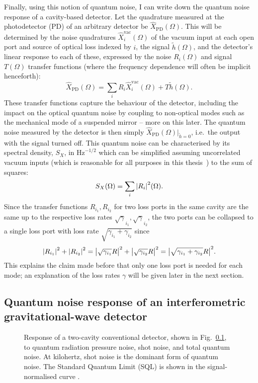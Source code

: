 Finally, using this notion of quantum noise, I can write down the quantum noise response of a cavity-based detector. %
Let the quadrature measured at the photodetector (PD) of an arbitrary detector be $\hat{X}_\text{PD}(\Omega)$. This will be determined by the noise quadratures $\hat{X}_i^\text{vac}(\Omega)$ of the vacuum input at each open port and source of optical loss indexed by $i$, the signal $\tilde{h}(\Omega)$, and the detector's linear response to each of these, expressed by the noise $R_i(\Omega)$ and signal $T(\Omega)$ transfer functions (where the frequency dependence will often be implicit henceforth): $$\hat X_\text{PD}(\Omega)=\sum_i R_i \hat X_i^\text{vac}(\Omega) + T \tilde h(\Omega).$$
These transfer functions capture the behaviour of the detector, including the impact on the optical quantum noise by coupling to non-optical modes such as the mechanical mode of a suspended mirror -- more on this later. 
The quantum noise measured by the detector is then simply $\hat X_\text{PD}(\Omega)|_{\tilde h=0}$, i.e.\ the output with the signal turned off. This quantum noise can be characterised by its spectral density, $S_X$, in $\text{Hz}^{-1/2}$ which can be simplified assuming uncorrelated vacuum inputs (which is reasonable for all purposes in this thesis~\cite{}) to the sum of squares: $$S_X(\Omega)=\sum_i \abs{R_i}^2(\Omega).$$ 
Since the transfer functions $R_{i_1}, R_{i_2}$ for two loss ports in the same cavity are the same up to the respective loss rates $\sqrt\gamma_{i_1}, \sqrt\gamma_{i_2}$, the two ports can be collapsed to a single loss port with loss rate $\sqrt{\gamma_{i_1}+\gamma_{i_2}}$ since $$\abs{R_{i_1}}^2+\abs{R_{i_2}}^2=\abs{\sqrt{\gamma_{i_1}}R}^2+\abs{\sqrt{\gamma_{i_2}}R}^2=\abs{\sqrt{\gamma_{i_1}+\gamma_{i_2}}R}^2.$$ This explains the claim made before that only one loss port is needed for each mode; an explanation of the loss rates $\gamma$ will be given later in the next section.



\subsection{Quantum noise response of an interferometric gravitational-wave detector}

\begin{figure}
	\centering
	\caption{Response of a two-cavity conventional detector, shown in Fig.~\ref{}, to quantum radiation pressure noise, shot noise, and total quantum noise. At kilohertz, shot noise is the dominant form of quantum noise. The Standard Quantum Limit (SQL) is shown in the signal-normalised curve .}
	\label{fig:simplifed_QN_response_conventional}
\end{figure}

